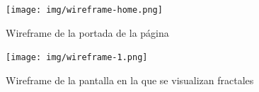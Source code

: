 \begin{figure} [ht]
    \centering
    \texttt{[image: img/wireframe-home.png]}
    \caption{Wireframe de la portada de la página}
    \label{fig:wireframe-home}
    \end{figure}

\begin{figure} [ht]
    \centering
    \texttt{[image: img/wireframe-1.png]}
    \caption{Wireframe de la pantalla en la que se visualizan fractales}
        \label{fig:wireframe-fractals}
    \end{figure}